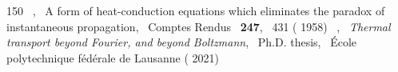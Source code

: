\documentclass[
prb,
twocolumn,
superscriptaddress,
 amsmath,amssymb,
 aps,
longbibliography,
]{revtex4-2}
\begin{document}
\begin{thebibliography}{150}
  \BibitemOpen
   { {~},\ } { {A form of heat-conduction equations which eliminates the paradox of instantaneous propagation},\ }\href@noop {} { { {Comptes Rendus}\ }\textbf { {247}},\  {431} ( {1958})}
  \BibitemOpen
   { {~},\ }\emph { {Thermal transport beyond Fourier, and beyond Boltzmann}},\ \href@noop {} {Ph.D. thesis},\  {École polytechnique fédérale de Lausanne} ( {2021})
\end{thebibliography}
\end{document}
